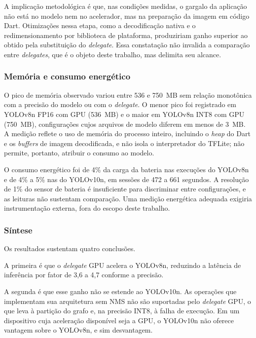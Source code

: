 \documentclass[artigo,times,capa]{iftex2024}
\begin{document}
A implicação metodológica é que, nas condições medidas, o gargalo da aplicação não está no modelo nem no acelerador, mas na preparação da imagem em código Dart. Otimizações nessa etapa, como a decodificação nativa e o redimensionamento por biblioteca de plataforma, produziriam ganho superior ao obtido pela substituição do \textit{delegate}. Essa constatação não invalida a comparação entre \textit{delegates}, que é o objeto deste trabalho, mas delimita seu alcance.

\subsubsection{Memória e consumo energético}
\label{sec:memoria_energia}

O pico de memória observado variou entre 536 e 750~MB sem relação monotônica com a precisão do modelo ou com o \textit{delegate}. O menor pico foi registrado em YOLOv8n \ac{FP16} com \ac{GPU} (536~MB) e o maior em YOLOv8n \ac{INT8} com \ac{GPU} (750~MB), configurações cujos arquivos de modelo diferem em menos de 3~MB. A medição reflete o uso de memória do processo inteiro, incluindo o \textit{heap} do Dart e os \textit{buffers} de imagem decodificada, e não isola o interpretador do \ac{TFLite}; não permite, portanto, atribuir o consumo ao modelo.

O consumo energético foi de 4\% da carga da bateria nas execuções do YOLOv8n e de 4\% a 5\% nas do YOLOv10n, em sessões de 472 a 661 segundos. A resolução de 1\% do sensor de bateria é insuficiente para discriminar entre configurações, e as leituras não sustentam comparação. Uma medição energética adequada exigiria instrumentação externa, fora do escopo deste trabalho.

\subsubsection{Síntese}
\label{sec:sintese_movel}

Os resultados sustentam quatro conclusões.

A primeira é que o \textit{delegate} \ac{GPU} acelera o YOLOv8n, reduzindo a latência de inferência por fator de 3,6 a 4,7 conforme a precisão.

A segunda é que esse ganho não se estende ao YOLOv10n. As operações que implementam sua arquitetura sem \ac{NMS} não são suportadas pelo \textit{delegate} \ac{GPU}, o que leva à partição do grafo e, na precisão \ac{INT8}, à falha de execução. Em um dispositivo cuja aceleração disponível seja a \ac{GPU}, o YOLOv10n não oferece vantagem sobre o YOLOv8n, e sim desvantagem.
\end{document}
